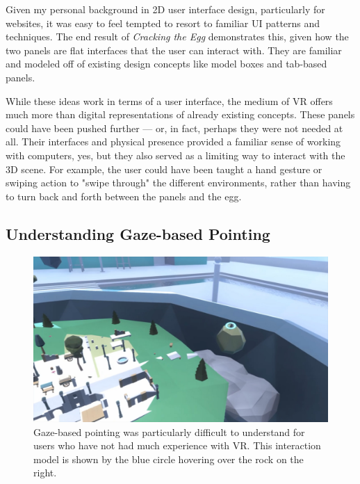 \documentclass[10pt,twocolumn,letterpaper]{article}
\begin{document}
Given my personal background in 2D user interface design, particularly for websites, it was easy to feel tempted to resort to familiar UI patterns and techniques. The end result of \textit{Cracking the Egg} demonstrates this, given how the two panels are flat interfaces that the user can interact with. They are familiar and modeled off of existing design concepts like model boxes and tab-based panels.

While these ideas work in terms of a user interface, the medium of VR offers much more than digital representations of already existing concepts. These panels could have been pushed further — or, in fact, perhaps they were not needed at all. Their interfaces and physical presence provided a familiar sense of working with computers, yes, but they also served as a limiting way to interact with the 3D scene. For example, the user could have been taught a hand gesture or swiping action to "swipe through" the different environments, rather than having to turn back and forth between the panels and the egg.

\subsection{Understanding Gaze-based Pointing}

\begin{figure}[t]
\begin{center}
\includegraphics[width=1.0\linewidth]{images/gazepointing.jpg}
\end{center}
   \caption{ Gaze-based pointing was particularly difficult to understand for users who have not had much experience with VR. This interaction model is shown by the blue circle hovering over the rock on the right. }
\label{fig:long}
\label{fig:onecol}
\end{figure}
\end{document}
